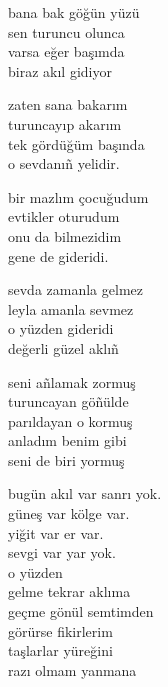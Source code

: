 \documentclass[10pt, openright, oneside]{memoir}
\theoremstyle{definition}
\begin{document}
\vspace*{\fill}
%
\newpage
{}
\vspace*{\fill}
\settowidth{\versewidth}{o sevdanı\~n yelidir.}
\begin{cverse}
  bana bak göğün yüzü \\
  sen turuncu olunca \\
  varsa eğer başımda \\
  biraz akıl gidiyor

  zaten sana bakarım \\
  turuncayıp akarım \\
  tek gördüğüm başında \\
  o sevdanı\~n yelidir.

  bir mazlım çocuğudum \\
  evtikler oturudum \\
  onu da bilmezidim \\
  gene de gideridi.

  sevda zamanla gelmez \\
  leyla amanla sevmez \\
  o yüzden gideridi \\
  değerli güzel aklı\~n

  seni a\~nlamak zormuş \\
  turuncayan gö\~nülde \\
  parıldayan o kormuş \\
  anladım benim gibi \\
  seni de biri yormuş
\end{cverse}
\vspace*{\fill}
%
\newpage
{}
\vspace*{\fill}
\settowidth{\versewidth}{bugün akıl var sanrı yok.}
\begin{cverse}
  bugün akıl var sanrı yok. \\
  güneş var kölge var. \\
  yiğit var er var. \\
  sevgi var yar yok. \\
  o yüzden  \\
  gelme tekrar aklıma \\
  geçme gönül semtimden \\
  görürse fikirlerim \\
  taşlarlar yüreğini \\
  razı olmam yanmana
\end{cverse}
\end{document}
